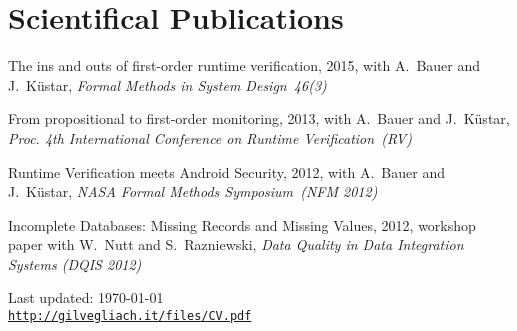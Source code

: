 \documentclass[letterpaper]{article}
\def\footerlink{http://gilvegliach.it/files/CV.pdf}
\newenvironment{no-indent-itemize}{
  \begin{list}{}{
    \setlength{\leftmargin}{0em}
  }
}{
  \end{list}
}
\begin{document}
\section*{Scientifical Publications}
\begin{no-indent-itemize}
  \item The ins and outs of first-order runtime verification, 2015, with A.~Bauer and J.~K\"{u}star, 
        {\it Formal Methods in System Design~46(3)}
  \item From propositional to first-order monitoring, 2013, with A.~Bauer and J.~K\"{u}star, 
        {\it Proc. 4th International Conference on Runtime Verification~(RV)}
  \item Runtime Verification meets Android Security, 2012, with A.~Bauer and J.~K\"{u}star, 
        {\it NASA Formal Methods Symposium~(NFM 2012)}
  \item Incomplete Databases: Missing Records and Missing Values, 2012, workshop paper with 
        W.~Nutt and S.~Razniewski, {\it Data Quality in Data Integration Systems (DQIS 2012)}
\end{no-indent-itemize}

\bigskip
\begin{center}
  \begin{footnotesize}
    Last updated: \today \\
    \href{\footerlink}{\texttt{\footerlink}}
  \end{footnotesize}
\end{center}
\end{document}
